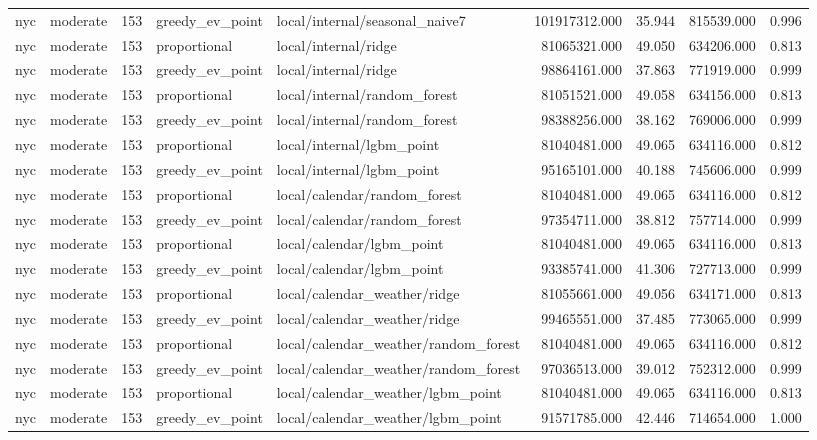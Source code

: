 \begin{tabular}{llrllrrrr}
nyc & moderate & 153 & greedy\_ev\_point & local/internal/seasonal\_naive7 & 101917312.000 & 35.944 & 815539.000 & 0.996 \\
nyc & moderate & 153 & proportional & local/internal/ridge & 81065321.000 & 49.050 & 634206.000 & 0.813 \\
nyc & moderate & 153 & greedy\_ev\_point & local/internal/ridge & 98864161.000 & 37.863 & 771919.000 & 0.999 \\
nyc & moderate & 153 & proportional & local/internal/random\_forest & 81051521.000 & 49.058 & 634156.000 & 0.813 \\
nyc & moderate & 153 & greedy\_ev\_point & local/internal/random\_forest & 98388256.000 & 38.162 & 769006.000 & 0.999 \\
nyc & moderate & 153 & proportional & local/internal/lgbm\_point & 81040481.000 & 49.065 & 634116.000 & 0.812 \\
nyc & moderate & 153 & greedy\_ev\_point & local/internal/lgbm\_point & 95165101.000 & 40.188 & 745606.000 & 0.999 \\
nyc & moderate & 153 & proportional & local/calendar/random\_forest & 81040481.000 & 49.065 & 634116.000 & 0.812 \\
nyc & moderate & 153 & greedy\_ev\_point & local/calendar/random\_forest & 97354711.000 & 38.812 & 757714.000 & 0.999 \\
nyc & moderate & 153 & proportional & local/calendar/lgbm\_point & 81040481.000 & 49.065 & 634116.000 & 0.813 \\
nyc & moderate & 153 & greedy\_ev\_point & local/calendar/lgbm\_point & 93385741.000 & 41.306 & 727713.000 & 0.999 \\
nyc & moderate & 153 & proportional & local/calendar\_weather/ridge & 81055661.000 & 49.056 & 634171.000 & 0.813 \\
nyc & moderate & 153 & greedy\_ev\_point & local/calendar\_weather/ridge & 99465551.000 & 37.485 & 773065.000 & 0.999 \\
nyc & moderate & 153 & proportional & local/calendar\_weather/random\_forest & 81040481.000 & 49.065 & 634116.000 & 0.812 \\
nyc & moderate & 153 & greedy\_ev\_point & local/calendar\_weather/random\_forest & 97036513.000 & 39.012 & 752312.000 & 0.999 \\
nyc & moderate & 153 & proportional & local/calendar\_weather/lgbm\_point & 81040481.000 & 49.065 & 634116.000 & 0.813 \\
nyc & moderate & 153 & greedy\_ev\_point & local/calendar\_weather/lgbm\_point & 91571785.000 & 42.446 & 714654.000 & 1.000 \\

\end{tabular}
